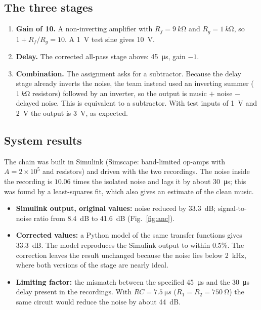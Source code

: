 \subsection{The three stages}
\begin{enumerate}
  \item \textbf{Gain of 10.} A non-inverting amplifier with $R_f=\SI{9}{k\ohm}$ and $R_g=\SI{1}{k\ohm}$, so $1 + R_f/R_g = 10$. A \SI{1}{V} test sine gives \SI{10}{V}.
  \item \textbf{Delay.} The corrected all-pass stage above: \SI{45}{\micro s}, gain $-1$.
  \item \textbf{Combination.} The assignment asks for a subtractor. Because the delay stage already
    inverts the noise, the team instead used an inverting summer ($\SI{1}{k\ohm}$ resistors) followed by an
    inverter, so the output is music $+$ noise $-$ delayed noise. This is equivalent to a subtractor. With
    test inputs of \SI{1}{V} and \SI{2}{V} the output is \SI{3}{V}, as expected.
\end{enumerate}

\subsection{System results}
The chain was built in Simulink (Simscape: band-limited op-amps with $A=2\times10^5$ and resistors) and driven with the two recordings.
The noise inside the recording is $10.06$ times the isolated noise and lags it by about \SI{30}{\micro s};
this was found by a least-squares fit, which also gives an estimate of the clean music.
\begin{itemize}
  \item \textbf{Simulink output, original values:} noise reduced by \SI{33.3}{dB}; signal-to-noise ratio from \SI{8.4}{dB} to \SI{41.6}{dB} (Fig.~\ref{fig:anc}).
  \item \textbf{Corrected values:} a Python model of the same transfer functions gives \SI{33.3}{dB}. The model reproduces the Simulink output to within 0.5\%. The correction leaves the result unchanged because the noise lies below \SI{2}{kHz}, where both versions of the stage are nearly ideal.
  \item \textbf{Limiting factor:} the mismatch between the specified \SI{45}{\micro s} and the \SI{30}{\micro s} delay present in the recordings.
    With $RC = \SI{7.5}{\micro s}$ ($R_1=R_2=\SI{750}{\ohm}$) the same circuit would reduce the noise by about \SI{44}{dB}.
\end{itemize}


